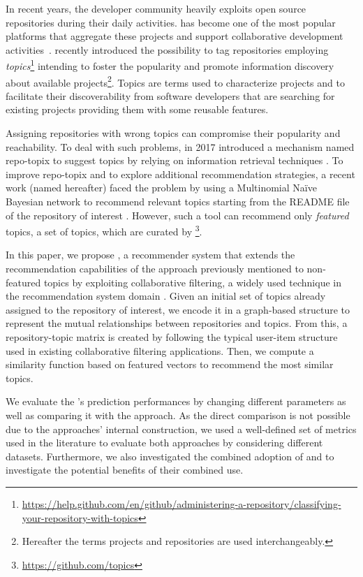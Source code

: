 In recent years, the developer community heavily exploits open source 
repositories during their daily activities. \GH has become one of the most
popular platforms that aggregate these projects and support collaborative 
development activities~\cite{7832894}. \GH recently introduced the possibility 
to tag repositories employing 
\emph{topics}\footnote{\url{https://help.github.com/en/github/administering-a-repository/classifying-your-repository-with-topics}}
 intending to foster the popularity and promote information discovery about 
available projects\footnote{Hereafter the terms \GH projects and repositories 
are used 
interchangeably.}. Topics are terms used to characterize projects and to 
facilitate their discoverability from software developers that are searching 
for existing projects providing them with some reusable features. 

Assigning repositories with wrong topics can compromise their popularity and 
reachability. To deal with such problems, in 2017 \GH introduced a 
mechanism named repo-topix to suggest topics by relying on information 
retrieval techniques \cite{repo-topix}. To improve repo-topix 
and to explore additional recommendation strategies, a recent work (named \MNB 
hereafter) faced the problem by using a Multinomial Na\"ive Bayesian network to 
recommend relevant topics starting from the README file of the repository of 
interest \cite{10.1145/3383219.3383227}. However, such a tool can recommend 
only \emph{featured} topics, \ie a set of topics, which are curated by 
\GH\footnote{\url{https://github.com/topics}}.


In this paper, we propose \CT, a recommender system that extends the 
recommendation capabilities of the \MNB approach previously mentioned to 
non-featured topics by exploiting collaborative filtering, a widely used 
technique in the recommendation system domain 
\cite{Schafer:2007:CFR:1768197.1768208}. Given an initial set of topics already 
assigned to the \GH repository of interest, we encode it in a graph-based 
structure to represent the mutual relationships between repositories and 
topics. From this, a repository-topic matrix is created by following the 
typical user-item structure used in existing collaborative filtering 
applications. Then, we compute a similarity function based on featured vectors 
to recommend the most similar topics.

We evaluate the \CT's prediction performances by changing different parameters 
as well as comparing it with the \MNB approach. As the direct comparison is not 
possible due to the approaches' internal construction, we used a well-defined 
set of metrics used in the literature to evaluate both approaches by 
considering different datasets. Furthermore, we also investigated the combined 
adoption of \MNB and \TF to investigate the potential benefits of their 
combined 
use. 

